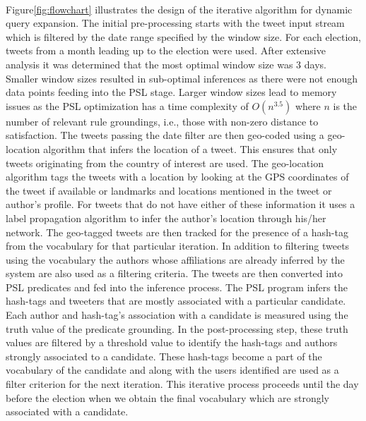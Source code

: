 \paragraph{}
Figure\ref{fig:flowchart} illustrates the design of the iterative algorithm for dynamic query expansion.
The initial pre-processing starts with the tweet input stream which is filtered by the date range specified by the window size. 
For each election, tweets from a month leading up to the election were used.
After extensive analysis it was determined that the most optimal window size was 3 days. 
Smaller window sizes resulted in sub-optimal inferences as there were not enough data points feeding into the PSL stage.
Larger window sizes lead to memory issues as the PSL optimization has a time complexity of  $O(n^{3.5})$ where $n$ is the number of relevant rule groundings, i.e., those with non-zero distance to satisfaction. 
The tweets passing the date filter are then geo-coded using a geo-location algorithm that infers the location of a tweet. 
This ensures that only tweets originating from the country of interest are used.
The geo-location algorithm tags the tweets with a location by looking at the GPS coordinates of the tweet if available or landmarks and locations mentioned in the tweet or author's profile. 
For tweets that do not have either of these information it uses a label propagation algorithm to infer the author's location through his/her network.
\newline
The geo-tagged tweets are then tracked for the presence of a hash-tag from the vocabulary for that particular iteration.
In addition to filtering tweets using the vocabulary the authors whose affiliations are already inferred by the system are also used as a filtering criteria.
The tweets are then converted into PSL predicates and fed into the inference process.
The PSL program infers the hash-tags and tweeters that are mostly associated with a particular candidate. 
Each author and hash-tag's association with a candidate is measured using the truth value of the predicate grounding.
In the post-processing step, these truth values are filtered by a threshold value to identify the hash-tags and authors strongly associated to a candidate.
These hash-tags become a part of the vocabulary of the candidate and along with the users identified are used as a filter criterion for the next iteration.
This iterative process proceeds until the day before the election when we obtain the final vocabulary which are strongly associated with a candidate.
